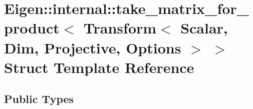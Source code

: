 \hypertarget{struct_eigen_1_1internal_1_1take__matrix__for__product_3_01_transform_3_01_scalar_00_01_dim_00_0edf36e01556babc5f053852863696371}{}\section{Eigen\+:\+:internal\+:\+:take\+\_\+matrix\+\_\+for\+\_\+product$<$ Transform$<$ Scalar, Dim, Projective, Options $>$ $>$ Struct Template Reference}
\label{struct_eigen_1_1internal_1_1take__matrix__for__product_3_01_transform_3_01_scalar_00_01_dim_00_0edf36e01556babc5f053852863696371}
\subsection*{Public Types}
